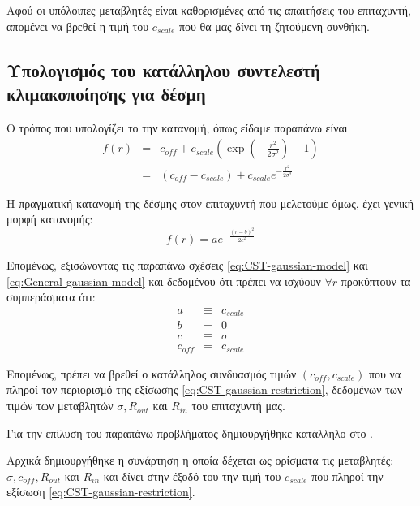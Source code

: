 Αφού οι υπόλοιπες μεταβλητές είναι καθορισμένες από τις απαιτήσεις του επιταχυντή, απομένει να βρεθεί η τιμή του $c_{scale}$ που θα μας δίνει τη ζητούμενη συνθήκη.

\subsection{Υπολογισμός του κατάλληλου συντελεστή κλιμακοποίησης για  δέσμη}

Ο τρόπος που υπολογίζει το  την  κατανομή, όπως είδαμε παραπάνω είναι
\begin{eqnarray}\label{eq:CST-gaussian-model}
f(r) &= & 	c_{off} + c_{scale} \left( \exp \left(-\frac{r^2}{2\sigma^2}\right) - 1 \right) \nonumber \\
&= &\left(c_{off} - c_{scale}\right) + c_{scale} e^{-\frac{r^2}{2\sigma^2}}
\end{eqnarray}

Η πραγματική κατανομή της δέσμης στον επιταχυντή που μελετούμε όμως, έχει γενική μορφή κατανομής:
\begin{equation}\label{eq:General-gaussian-model}
 f(r) = a e^{-\frac{\left(r-b\right)^2}{2c^2}}
\end{equation}

Επομένως, εξισώνοντας τις παραπάνω σχέσεις \ref{eq:CST-gaussian-model} και \ref{eq:General-gaussian-model} και δεδομένου ότι πρέπει να ισχύουν $\forall r$ προκύπτουν τα συμπεράσματα ότι:
\begin{eqnarray}
a &\equiv & c_{scale}\nonumber \\
b &= &0\nonumber \\
c &\equiv & \sigma \nonumber \\
c_{off} &=&  c_{scale} 
\end{eqnarray}

Επομένως, πρέπει να βρεθεί ο κατάλληλος συνδυασμός τιμών $\left(c_{off}, c_{scale}\right)$ που να πληροί τον περιορισμό της εξίσωσης \ref{eq:CST-gaussian-restriction}, δεδομένων των τιμών των μεταβλητών $\sigma, R_{out}$ και $R_{in}$ του επιταχυντή μας.

Για την επίλυση του παραπάνω προβλήματος δημιουργήθηκε κατάλληλο  στο . 

Αρχικά δημιουργήθηκε η συνάρτηση  η οποία δέχεται ως ορίσματα τις μεταβλητές: $\sigma, c_{off}, R_{out}$ και $R_{in}$ και δίνει στην έξοδό του την τιμή του $c_{scale}$ που πληροί την εξίσωση \ref{eq:CST-gaussian-restriction}.

